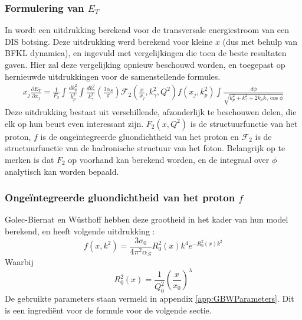 \documentclass[a4paper,11pt]{article}
\numberwithin{equation}{section} %
\begin{document}
    \subsubsection{Formulering van $E_T$}
In \cite{ET} wordt een uitdrukking berekend voor de transversale energiestroom van een DIS botsing.
Deze uitdrukking werd berekend voor kleine $x$ (dus met behulp van BFKL dynamica), en ingevuld met vergelijkingen die toen de beste resultaten gaven.
Hier zal deze vergelijking opnieuw beschouwd worden, en toegepast op hernieuwde uitdrukkingen voor de samenstellende formules.
\begin{align} \label{eq:ET}
x_j \frac{\partial E_T}{\partial x_j} = \frac{1}{F_2} \int \frac{dk_p^2}{k_p^2} \int \frac{dk_\gamma^2}{k_\gamma^2} \left( \frac{3\alpha_S}{\pi} \right) \mathcal{F}_2 \left( \frac{x}{x_j}, k_\gamma^2, Q^2 \right) f(x_j,k_p^2) \int \frac{d\phi}{\sqrt{k_p^2+k_\gamma^2 + 2k_p k_\gamma \cos{\phi}}}
\end{align}
Deze uitdrukking bestaat uit verschillende, afzonderlijk te beschouwen delen, die elk op hun beurt even interessant zijn.
$F_2 (x, Q^2)$ is de structuurfunctie van het proton, $f$ is de ongeïntegreerde gluondichtheid van het proton en $\mathcal{F}_2$ is de structuurfunctie van de hadronische structuur van het foton.
Belangrijk op te merken is dat $F_2$ op voorhand kan berekend worden, en de integraal over $\phi$ analytisch kan worden bepaald.
 
    \subsubsection{Ongeïntegreerde gluondichtheid van het proton $f$}
Golec-Biernat en Wüsthoff hebben deze grootheid in het kader van hun model berekend, en heeft volgende uitdrukking \cite[vgl. 9.255]{Barone}:
\begin{equation}
f(x,k^2) = \frac{3 \sigma_0}{4\pi^2 \alpha_S} R_0^2 (x) k^4 e^{-R_0^2(x) k^2}
\end{equation}
Waarbij
\begin{equation}
R_0^2(x) = \frac{1}{Q_0^2} \left( \frac{x}{x_0} \right)^\lambda
\end{equation}
De gebruikte parameters staan vermeld in appendix \ref{app:GBWParameters}.
Dit is een ingrediënt voor de formule voor de volgende sectie.
\end{document}
